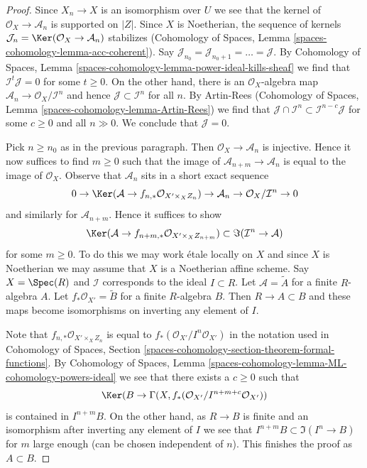 \begin{proof}
\medskip\noindent
Since $X_n \to X$ is an isomorphism over $U$ we see that the kernel
of $\mathcal{O}_X \to \mathcal{A}_n$ is supported on $|Z|$.
Since $X$ is Noetherian, the sequence of kernels
$\mathcal{J}_n = \Ker(\mathcal{O}_X \to \mathcal{A}_n)$ stabilizes
(Cohomology of Spaces, Lemma \ref{spaces-cohomology-lemma-acc-coherent}).
Say $\mathcal{J}_{n_0} = \mathcal{J}_{n_0 + 1} = \ldots = \mathcal{J}$.
By Cohomology of Spaces, Lemma
\ref{spaces-cohomology-lemma-power-ideal-kills-sheaf}
we find that $\mathcal{I}^t \mathcal{J} = 0$ for some $t \geq 0$.
On the other hand, there is an $\mathcal{O}_X$-algebra map
$\mathcal{A}_n \to \mathcal{O}_X/\mathcal{I}^n$
and hence $\mathcal{J} \subset \mathcal{I}^n$ for all $n$.
By Artin-Rees (Cohomology of Spaces, Lemma
\ref{spaces-cohomology-lemma-Artin-Rees}) we find that
$\mathcal{J} \cap \mathcal{I}^n \subset \mathcal{I}^{n - c}\mathcal{J}$
for some $c  \geq 0$ and all $n \gg 0$. We conclude that $\mathcal{J} = 0$.

\medskip\noindent
Pick $n \geq n_0$ as in the previous paragraph. Then
$\mathcal{O}_X \to \mathcal{A}_n$ is injective. Hence it now
suffices to find $m \geq 0$ such that the image of
$\mathcal{A}_{n + m} \to \mathcal{A}_n$ is equal
to the image of $\mathcal{O}_X$. Observe that $\mathcal{A}_n$
sits in a short exact sequence
$$
0 \to \Ker(\mathcal{A} \to f_{n, *}\mathcal{O}_{X' \times_X Z_n})
\to \mathcal{A}_n \to \mathcal{O}_X/\mathcal{I}^n \to 0
$$
and similarly for $\mathcal{A}_{n + m}$. Hence it suffices to show
$$
\Ker(\mathcal{A} \to f_{n + m, *}\mathcal{O}_{X' \times_X Z_{n + m}})
\subset
\Im(\mathcal{I}^n \to \mathcal{A})
$$
for some $m \geq 0$. To do this we may work \'etale locally on
$X$ and since $X$ is Noetherian we may assume that $X$ is
a Noetherian affine scheme. Say $X = \Spec(R)$ and $\mathcal{I}$
corresponds to the ideal $I \subset R$. Let $\mathcal{A} = \widetilde{A}$
for a finite $R$-algebra $A$. Let $f_*\mathcal{O}_{X'} = \widetilde{B}$
for a finite $R$-algebra $B$. Then $R \to A \subset B$ and these maps
become isomorphisms on inverting any element of $I$.

\medskip\noindent
Note that $f_{n, *}\mathcal{O}_{X' \times_X Z_n}$
is equal to $f_*(\mathcal{O}_{X'}/I^n\mathcal{O}_{X'})$
in the notation used in Cohomology of Spaces, Section
\ref{spaces-cohomology-section-theorem-formal-functions}.
By Cohomology of Spaces, Lemma
\ref{spaces-cohomology-lemma-ML-cohomology-powers-ideal}
we see that there exists a $c \geq 0$ such that
$$
\Ker(B \to \Gamma(X, f_*(\mathcal{O}_{X'}/I^{n + m + c}\mathcal{O}_{X'}))
$$
is contained in $I^{n + m}B$. On the other hand, as $R \to B$ is
finite and an isomorphism after inverting any element of $I$
we see that $I^{n + m}B \subset \Im(I^n \to B)$ for $m$ large enough
(can be chosen independent of $n$). This finishes the proof as $A \subset B$.
\end{proof}
